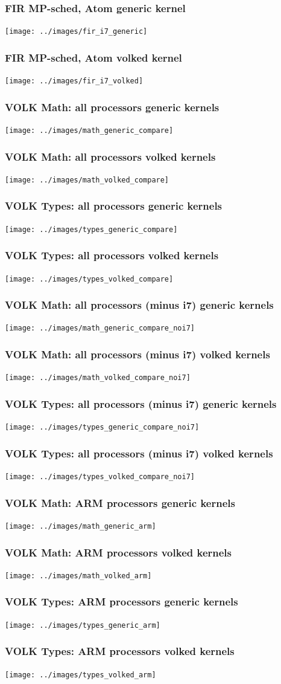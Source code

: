 \documentclass{beamer}
\begin{document}
\begin{frame}
  \frametitle{FIR MP-sched, Atom generic kernel}
  \texttt{[image: ../images/fir\_i7\_generic]}
\end{frame}
\begin{frame}
  \frametitle{FIR MP-sched, Atom volked kernel}
  \texttt{[image: ../images/fir\_i7\_volked]}
\end{frame}
\begin{frame}
  \frametitle{VOLK Math: all processors generic kernels}
  \texttt{[image: ../images/math\_generic\_compare]}
\end{frame}
\begin{frame}
  \frametitle{VOLK Math: all processors volked kernels}
  \texttt{[image: ../images/math\_volked\_compare]}
\end{frame}
\begin{frame}
  \frametitle{VOLK Types: all processors generic kernels}
  \texttt{[image: ../images/types\_generic\_compare]}
\end{frame}
\begin{frame}
  \frametitle{VOLK Types: all processors volked kernels}
  \texttt{[image: ../images/types\_volked\_compare]}
\end{frame}


\begin{frame}
  \frametitle{VOLK Math: all processors (minus i7) generic kernels}
  \texttt{[image: ../images/math\_generic\_compare\_noi7]}
\end{frame}
\begin{frame}
  \frametitle{VOLK Math: all processors (minus i7) volked kernels}
  \texttt{[image: ../images/math\_volked\_compare\_noi7]}
\end{frame}
\begin{frame}
  \frametitle{VOLK Types: all processors (minus i7) generic kernels}
  \texttt{[image: ../images/types\_generic\_compare\_noi7]}
\end{frame}
\begin{frame}
  \frametitle{VOLK Types: all processors (minus i7) volked kernels}
  \texttt{[image: ../images/types\_volked\_compare\_noi7]}
\end{frame}

\begin{frame}
  \frametitle{VOLK Math: ARM processors generic kernels}
  \texttt{[image: ../images/math\_generic\_arm]}
\end{frame}
\begin{frame}
  \frametitle{VOLK Math: ARM processors volked kernels}
  \texttt{[image: ../images/math\_volked\_arm]}
\end{frame}
\begin{frame}
  \frametitle{VOLK Types: ARM processors generic kernels}
  \texttt{[image: ../images/types\_generic\_arm]}
\end{frame}
\begin{frame}
  \frametitle{VOLK Types: ARM processors volked kernels}
  \texttt{[image: ../images/types\_volked\_arm]}
\end{frame}
\end{document}
